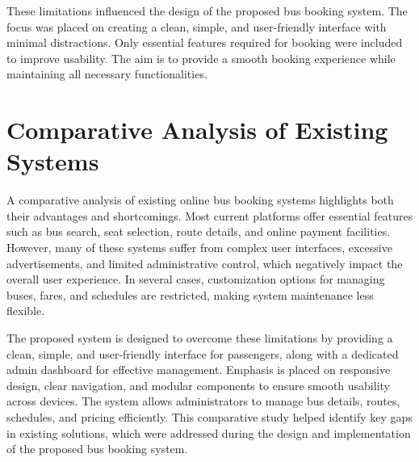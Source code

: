 These limitations influenced the design of the proposed bus booking system. The focus was placed on creating a clean, simple, and user-friendly interface with minimal distractions. Only essential features required for booking were included to improve usability. The aim is to provide a smooth booking experience while maintaining all necessary functionalities.

\section*{Comparative Analysis of Existing Systems}

A comparative analysis of existing online bus booking systems highlights both their advantages and shortcomings. Most current platforms offer essential features such as bus search, seat selection, route details, and online payment facilities. However, many of these systems suffer from complex user interfaces, excessive advertisements, and limited administrative control, which negatively impact the overall user experience. In several cases, customization options for managing buses, fares, and schedules are restricted, making system maintenance less flexible.

The proposed system is designed to overcome these limitations by providing a clean, simple, and user-friendly interface for passengers, along with a dedicated admin dashboard for effective management. Emphasis is placed on responsive design, clear navigation, and modular components to ensure smooth usability across devices. The system allows administrators to manage bus details, routes, schedules, and pricing efficiently. This comparative study helped identify key gaps in existing solutions, which were addressed during the design and implementation of the proposed bus booking system.
